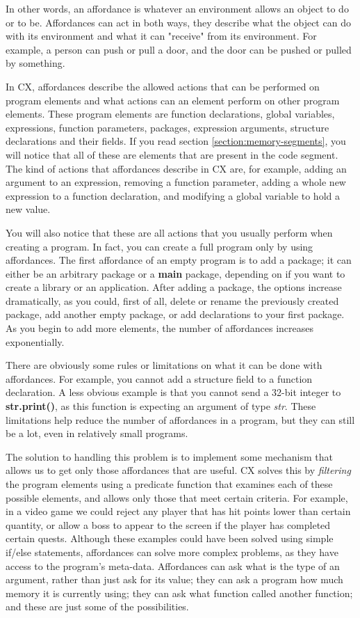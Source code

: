 \documentclass[11pt,fleqn,openany]{book} %
\begin{document}
In other words, an affordance is whatever an environment allows an object to do or to be. Affordances can act in both ways, they describe what the object can do with its environment and what it can "receive" from its environment. For example, a person can push or pull a door, and the door can be pushed or pulled by something.

In CX, affordances describe the allowed actions that can be performed on program elements and what actions can an element perform on other program elements. These program elements are function declarations, global variables, expressions, function parameters, packages, expression arguments, structure declarations and their fields. If you read section \ref{section:memory-segments}, you will notice that all of these are elements that are present in the code segment. The kind of actions that affordances describe in CX are, for example, adding an argument to an expression, removing a function parameter, adding a whole new expression to a function declaration, and modifying a global variable to hold a new value.

You will also notice that these are all actions that you usually perform when creating a program. In fact, you can create a full program only by using affordances. The first affordance of an empty program is to add a package; it can either be an arbitrary package or a \textbf{main} package, depending on if you want to create a library or an application. After adding a package, the options increase dramatically, as you could, first of all, delete or rename the previously created package, add another empty package, or add declarations to your first package. As you begin to add more elements, the number of affordances increases exponentially.

There are obviously some rules or limitations on what it can be done with affordances. For example, you cannot add a structure field to a function declaration. A less obvious example is that you cannot send a 32-bit integer to \textbf{str.print()}, as this function is expecting an argument of type \emph{str}. These limitations help reduce the number of affordances in a program, but they can still be a lot, even in relatively small programs.

The solution to handling this problem is to implement some mechanism that allows us to get only those affordances that are useful. CX solves this by \emph{filtering} the program elements using a predicate function that examines each of these possible elements, and allows only those that meet certain criteria. For example, in a video game we could reject any player that has hit points lower than certain quantity, or allow a boss to appear to the screen if the player has completed certain quests. Although these examples could have been solved using simple if/else statements, affordances can solve more complex problems, as they have access to the program's meta-data. Affordances can ask what is the type of an argument, rather than just ask for its value; they can ask a program how much memory it is currently using; they can ask what function called another function; and these are just some of the possibilities.
\end{document}
